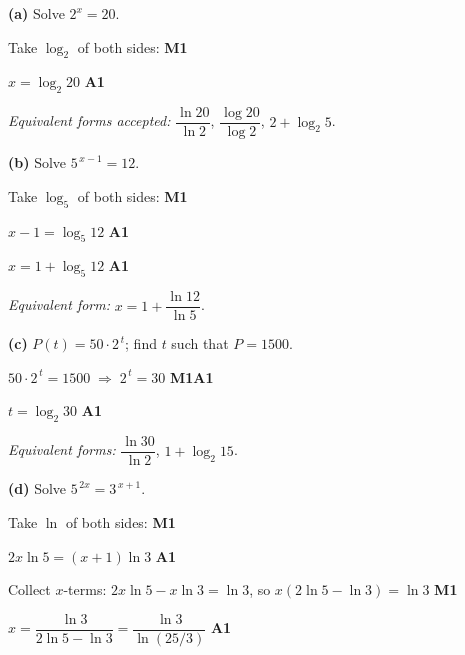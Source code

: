 \documentclass[12pt, twoside]{article}
\begin{document}
\begin{enumerate}[itemsep=0.3cm]
\textbf{(a)} Solve $2^x = 20$.

Take $\log_2$ of both sides: \hfill \textbf{M1}

$x = \log_2 20$ \hfill \textbf{A1}

\smallskip

\emph{Equivalent forms accepted:} $\dfrac{\ln 20}{\ln 2}$,
$\dfrac{\log 20}{\log 2}$, $2 + \log_2 5$.

\medskip

\textbf{(b)} Solve $5^{\,x-1} = 12$.

Take $\log_5$ of both sides: \hfill \textbf{M1}

$x - 1 = \log_5 12$ \hfill \textbf{A1}

$x = 1 + \log_5 12$ \hfill \textbf{A1}

\smallskip

\emph{Equivalent form:} $x = 1 + \dfrac{\ln 12}{\ln 5}$.

\medskip

\textbf{(c)} $P(t) = 50 \cdot 2^{\,t}$; find $t$ such that $P = 1500$.

$50 \cdot 2^{\,t} = 1500 \;\Rightarrow\; 2^{\,t} = 30$ \hfill \textbf{M1\;A1}

$t = \log_2 30$ \hfill \textbf{A1}

\smallskip

\emph{Equivalent forms:} $\dfrac{\ln 30}{\ln 2}$,
$1 + \log_2 15$.

\medskip

\textbf{(d)} Solve $5^{\,2x} = 3^{\,x+1}$.

Take $\ln$ of both sides: \hfill \textbf{M1}

$2x \ln 5 = (x + 1) \ln 3$ \hfill \textbf{A1}

Collect $x$-terms:
$2x \ln 5 - x \ln 3 = \ln 3$, \;so\; $x(2\ln 5 - \ln 3) = \ln 3$
\hfill \textbf{M1}

$x = \dfrac{\ln 3}{2 \ln 5 - \ln 3} = \dfrac{\ln 3}{\ln(25/3)}$
\hfill \textbf{A1}

\end{enumerate}
\end{document}
